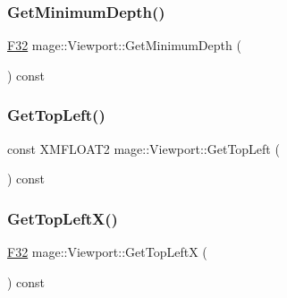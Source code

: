 \subsubsection{\texorpdfstring{Get\+Minimum\+Depth()}{GetMinimumDepth()}}
{\footnotesize\ttfamily \hyperlink{namespacemage_aa97e833b45f06d60a0a9c4fc22ae02c0}{F32} mage\+::\+Viewport\+::\+Get\+Minimum\+Depth (\begin{DoxyParamCaption}{ }\end{DoxyParamCaption}) const\hspace{0.3cm}{\ttfamily [noexcept]}}

\hypertarget{classmage_1_1_viewport_a778f561a002a8223820dc4ea4f3ec281}{}\label{classmage_1_1_viewport_a778f561a002a8223820dc4ea4f3ec281} 
\subsubsection{\texorpdfstring{Get\+Top\+Left()}{GetTopLeft()}}
{\footnotesize\ttfamily const X\+M\+F\+L\+O\+A\+T2 mage\+::\+Viewport\+::\+Get\+Top\+Left (\begin{DoxyParamCaption}{ }\end{DoxyParamCaption}) const\hspace{0.3cm}{\ttfamily [noexcept]}}

\hypertarget{classmage_1_1_viewport_a8ca949f032906839c8cf4ab6018bb2ba}{}\label{classmage_1_1_viewport_a8ca949f032906839c8cf4ab6018bb2ba} 
\subsubsection{\texorpdfstring{Get\+Top\+Left\+X()}{GetTopLeftX()}}
{\footnotesize\ttfamily \hyperlink{namespacemage_aa97e833b45f06d60a0a9c4fc22ae02c0}{F32} mage\+::\+Viewport\+::\+Get\+Top\+LeftX (\begin{DoxyParamCaption}{ }\end{DoxyParamCaption}) const\hspace{0.3cm}{\ttfamily [noexcept]}}

\hypertarget{classmage_1_1_viewport_a9d1ddb340c775c3652c816c551653d69}{}\label{classmage_1_1_viewport_a9d1ddb340c775c3652c816c551653d69} 
